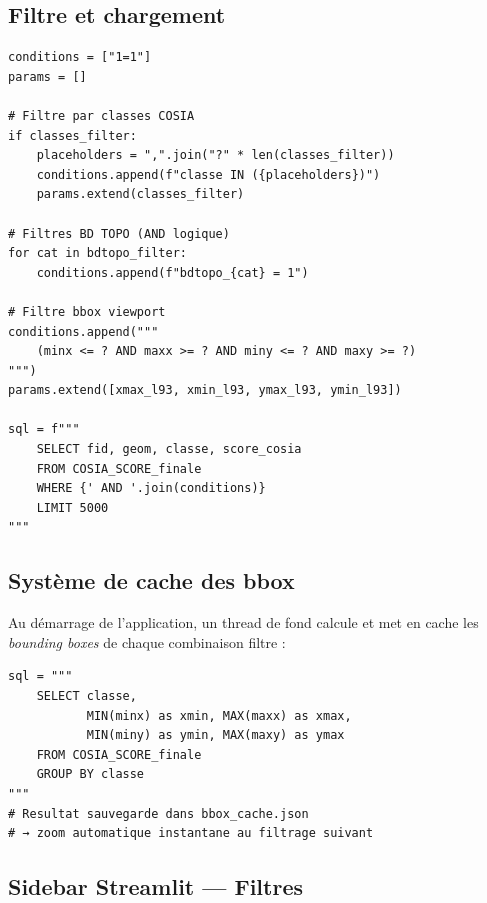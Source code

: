 \documentclass[12pt,a4paper]{report}
\begin{document}
\subsection{Filtre et chargement}

\begin{lstlisting}[language=Python3, caption={Requête SQL avec filtres dynamiques (api\_features)}]
conditions = ["1=1"]
params = []

# Filtre par classes COSIA
if classes_filter:
    placeholders = ",".join("?" * len(classes_filter))
    conditions.append(f"classe IN ({placeholders})")
    params.extend(classes_filter)

# Filtres BD TOPO (AND logique)
for cat in bdtopo_filter:
    conditions.append(f"bdtopo_{cat} = 1")

# Filtre bbox viewport
conditions.append("""
    (minx <= ? AND maxx >= ? AND miny <= ? AND maxy >= ?)
""")
params.extend([xmax_l93, xmin_l93, ymax_l93, ymin_l93])

sql = f"""
    SELECT fid, geom, classe, score_cosia
    FROM COSIA_SCORE_finale
    WHERE {' AND '.join(conditions)}
    LIMIT 5000
"""
\end{lstlisting}

\subsection{Système de cache des bbox}

Au démarrage de l'application, un thread de fond calcule et met en cache les \textit{bounding boxes} de chaque combinaison filtre :

\begin{lstlisting}[language=Python3, caption={Pré-calcul de la bbox par classe (background thread)}]
sql = """
    SELECT classe,
           MIN(minx) as xmin, MAX(maxx) as xmax,
           MIN(miny) as ymin, MAX(maxy) as ymax
    FROM COSIA_SCORE_finale
    GROUP BY classe
"""
# Resultat sauvegarde dans bbox_cache.json
# → zoom automatique instantane au filtrage suivant
\end{lstlisting}

\subsection{Sidebar Streamlit — Filtres}
\end{document}
